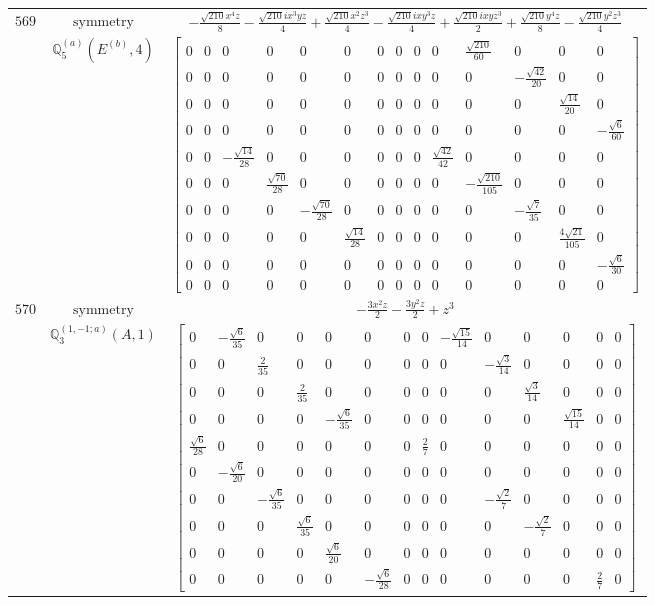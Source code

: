 \documentclass[fleqn,8pt,landscape]{jsarticle}
\begin{document}
\begin{longtable}{ccc}
$ 569 $ & $ \text{symmetry} $ & $ - \frac{\sqrt{210} x^{4} z}{8} - \frac{\sqrt{210} i x^{3} y z}{4} + \frac{\sqrt{210} x^{2} z^{3}}{4} - \frac{\sqrt{210} i x y^{3} z}{4} + \frac{\sqrt{210} i x y z^{3}}{2} + \frac{\sqrt{210} y^{4} z}{8} - \frac{\sqrt{210} y^{2} z^{3}}{4} $ \\
$  $ & $ \mathbb{Q}_{5}^{(a)}(E^{(b)},4) $ & $ \begin{bmatrix} 0 & 0 & 0 & 0 & 0 & 0 & 0 & 0 & 0 & 0 & \frac{\sqrt{210}}{60} & 0 & 0 & 0 \\ 0 & 0 & 0 & 0 & 0 & 0 & 0 & 0 & 0 & 0 & 0 & - \frac{\sqrt{42}}{20} & 0 & 0 \\ 0 & 0 & 0 & 0 & 0 & 0 & 0 & 0 & 0 & 0 & 0 & 0 & \frac{\sqrt{14}}{20} & 0 \\ 0 & 0 & 0 & 0 & 0 & 0 & 0 & 0 & 0 & 0 & 0 & 0 & 0 & - \frac{\sqrt{6}}{60} \\ 0 & 0 & - \frac{\sqrt{14}}{28} & 0 & 0 & 0 & 0 & 0 & 0 & \frac{\sqrt{42}}{42} & 0 & 0 & 0 & 0 \\ 0 & 0 & 0 & \frac{\sqrt{70}}{28} & 0 & 0 & 0 & 0 & 0 & 0 & - \frac{\sqrt{210}}{105} & 0 & 0 & 0 \\ 0 & 0 & 0 & 0 & - \frac{\sqrt{70}}{28} & 0 & 0 & 0 & 0 & 0 & 0 & - \frac{\sqrt{7}}{35} & 0 & 0 \\ 0 & 0 & 0 & 0 & 0 & \frac{\sqrt{14}}{28} & 0 & 0 & 0 & 0 & 0 & 0 & \frac{4 \sqrt{21}}{105} & 0 \\ 0 & 0 & 0 & 0 & 0 & 0 & 0 & 0 & 0 & 0 & 0 & 0 & 0 & - \frac{\sqrt{6}}{30} \\ 0 & 0 & 0 & 0 & 0 & 0 & 0 & 0 & 0 & 0 & 0 & 0 & 0 & 0 \end{bmatrix} $ \\ \hline
$ 570 $ & $ \text{symmetry} $ & $ - \frac{3 x^{2} z}{2} - \frac{3 y^{2} z}{2} + z^{3} $ \\
$  $ & $ \mathbb{Q}_{3}^{(1,-1;a)}(A,1) $ & $ \begin{bmatrix} 0 & - \frac{\sqrt{6}}{35} & 0 & 0 & 0 & 0 & 0 & 0 & - \frac{\sqrt{15}}{14} & 0 & 0 & 0 & 0 & 0 \\ 0 & 0 & \frac{2}{35} & 0 & 0 & 0 & 0 & 0 & 0 & - \frac{\sqrt{3}}{14} & 0 & 0 & 0 & 0 \\ 0 & 0 & 0 & \frac{2}{35} & 0 & 0 & 0 & 0 & 0 & 0 & \frac{\sqrt{3}}{14} & 0 & 0 & 0 \\ 0 & 0 & 0 & 0 & - \frac{\sqrt{6}}{35} & 0 & 0 & 0 & 0 & 0 & 0 & \frac{\sqrt{15}}{14} & 0 & 0 \\ \frac{\sqrt{6}}{28} & 0 & 0 & 0 & 0 & 0 & 0 & \frac{2}{7} & 0 & 0 & 0 & 0 & 0 & 0 \\ 0 & - \frac{\sqrt{6}}{20} & 0 & 0 & 0 & 0 & 0 & 0 & 0 & 0 & 0 & 0 & 0 & 0 \\ 0 & 0 & - \frac{\sqrt{6}}{35} & 0 & 0 & 0 & 0 & 0 & 0 & - \frac{\sqrt{2}}{7} & 0 & 0 & 0 & 0 \\ 0 & 0 & 0 & \frac{\sqrt{6}}{35} & 0 & 0 & 0 & 0 & 0 & 0 & - \frac{\sqrt{2}}{7} & 0 & 0 & 0 \\ 0 & 0 & 0 & 0 & \frac{\sqrt{6}}{20} & 0 & 0 & 0 & 0 & 0 & 0 & 0 & 0 & 0 \\ 0 & 0 & 0 & 0 & 0 & - \frac{\sqrt{6}}{28} & 0 & 0 & 0 & 0 & 0 & 0 & \frac{2}{7} & 0 \end{bmatrix} $ \\ \hline

\end{longtable}
\end{document}
